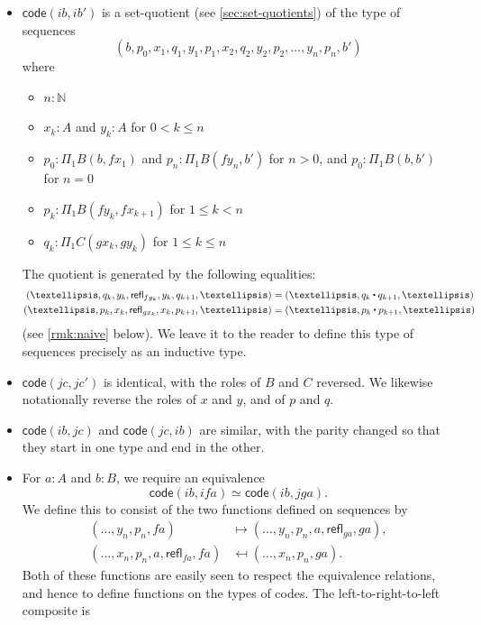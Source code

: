 \documentclass[10pt,a4paper]{article}
\newcommand{\refl}[1]{\ensuremath{\mathsf{refl}_{#1}}\xspace}
\newcommand{\ct}{%
  \mathchoice{\mathbin{\raisebox{0.5ex}{$\displaystyle\centerdot$}}}%
             {\mathbin{\raisebox{0.5ex}{$\centerdot$}}}%
             {\mathbin{\raisebox{0.25ex}{$\scriptstyle\,\centerdot\,$}}}%
             {\mathbin{\raisebox{0.1ex}{$\scriptscriptstyle\,\centerdot\,$}}}
}
\newcommand{\eqvsym}{\simeq}    %
\newcommand{\code}{\ensuremath{\mathsf{code}}\xspace}
\theoremstyle{definition}
\theoremstyle{remark}
\numberwithin{equation}{section}
\begin{document}
\begin{itemize}
\item $\code(ib,ib')$ is a set-quotient (see \cref{sec:set-quotients}) of the type of sequences %
  \[ (b, p_0, x_1, q_1, y_1, p_1, x_2, q_2, y_2, p_2, \dots, y_n, p_n, b') \]
  where
  \begin{itemize}
  \item $n:\mathbb{N}$
  \item $x_k:A$ and $y_k:A$ for $0<k \le n$
  \item $p_0:\Pi_1B(b,f x_1)$ and $p_n:\Pi_1B(f y_n, b')$ for $n>0$, and $p_0:\Pi_1B(b,b')$ for $n=0$
  \item $p_k:\Pi_1B(f y_k, fx_{k+1})$ for $1\le k < n$
  \item $q_k:\Pi_1C(gx_k, gy_k)$ for $1\le k\le n$
  \end{itemize}
  The quotient is generated by the following equalities:
  \begin{align*}
    (\dots, q_k, y_k, \refl{fy_k}, y_k, q_{k+1},\dots)
    &= (\dots, q_k\ct q_{k+1},\dots)\\
    (\dots, p_k, x_k, \refl{gx_k}, x_k, p_{k+1},\dots)
    &= (\dots, p_k\ct p_{k+1},\dots)
  \end{align*}
  (see \cref{rmk:naive} below).
  We leave it to the reader to define this type of sequences precisely as an inductive type.
\item $\code(jc,jc')$ is identical, with the roles of $B$ and $C$ reversed.
  We likewise notationally reverse the roles of $x$ and $y$, and of $p$ and $q$.
\item $\code(ib,jc)$ and $\code(jc,ib)$ are similar, with the parity changed so that they start in one type and end in the other.
\item For $a:A$ and $b:B$, we require an equivalence
  \begin{equation}
    \code(ib, ifa) \eqvsym \code(ib,jga).\label{eq:bfa-bga}
  \end{equation}
  We define this to consist of the two functions defined on sequences by
  \begin{align*}
    (\dots, y_n, p_n,fa) &\mapsto (\dots,y_n,p_n,a,\refl{ga},ga),\\
    (\dots, x_n, p_n, a, \refl{fa}, fa) &\mapsfrom (\dots, x_n, p_n, ga).
  \end{align*}
  Both of these functions are easily seen to respect the equivalence relations, and hence to define functions on the types of codes.
  The left-to-right-to-left composite is

\end{itemize}
\end{document}
